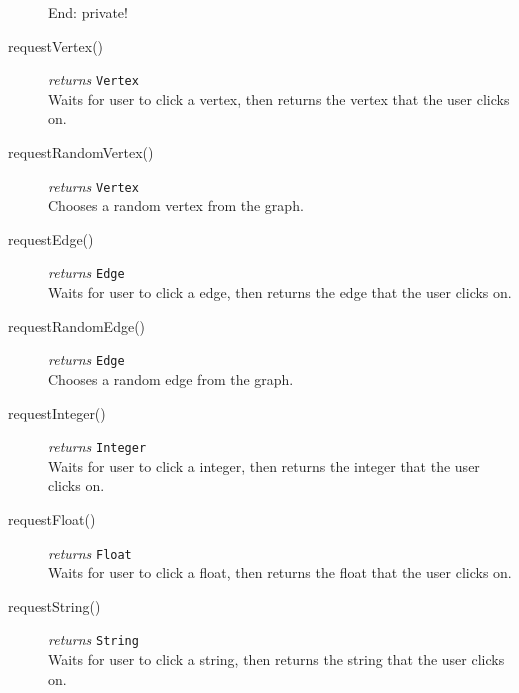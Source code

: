 \documentclass{article}
\newlength\q
\begin{document}
\begin{description}
{\Large End: private!}

\item[requestVertex()]\emph{returns}
  \texttt{Vertex}\\
Waits for user to click a vertex, then returns the vertex that the user clicks on. 

\item[requestRandomVertex()]\emph{returns}
  \texttt{Vertex}\\
Chooses a random vertex from the graph.

\item[requestEdge()]\emph{returns}
  \texttt{Edge}\\
Waits for user to click a edge, then returns the edge that the user clicks on. 

\item[requestRandomEdge()]\emph{returns}
  \texttt{Edge}\\
Chooses a random edge from the graph.

\item[requestInteger()]\emph{returns}
  \texttt{Integer}\\
Waits for user to click a integer, then returns the integer that the user clicks on. 

\item[requestFloat()]\emph{returns}
  \texttt{Float}\\
Waits for user to click a float, then returns the float that the user clicks on. 

\item[requestString()]\emph{returns}
  \texttt{String}\\
Waits for user to click a string, then returns the string that the user clicks on. 

\end{description}
\end{document}
